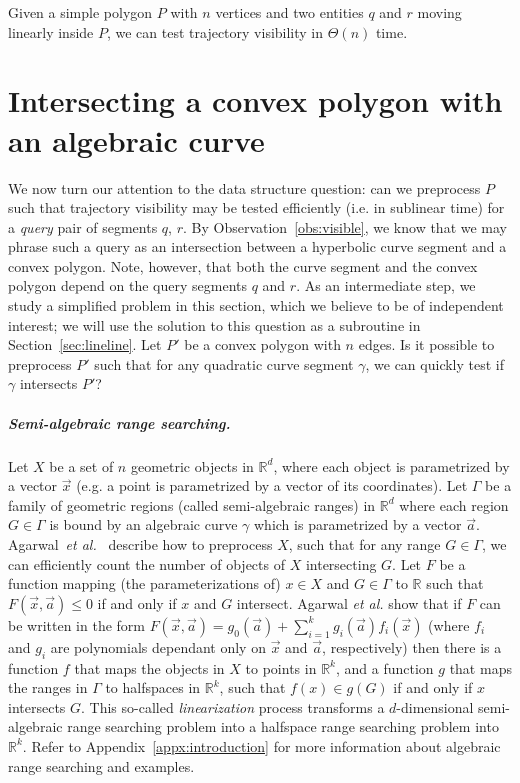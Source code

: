 \documentclass[UKenglish]{lipics-v2019}
\newcommand{\etal}{\textit{et al.}\xspace}
\newcommand{\mkmbb}[1]{\ensuremath{\mathbb{#1}}\xspace}
\newcommand{\R}{\mkmbb{R}}
\begin{document}
\begin{theorem}
  \label{thm:algorithm_simple_polygon}
  Given a simple polygon $P$ with $n$ vertices and two entities $q$ and $r$
  moving linearly inside $P$, we can test trajectory visibility in $\Theta(n)$ time.
\end{theorem}





  
\section{Intersecting a convex polygon with an algebraic curve}
\label{sec:prelims}
We now turn our attention to the data structure question: can we preprocess $P$ such that trajectory visibility may be tested efficiently (i.e. in sublinear time) for a {\em query} pair of segments $q$, $r$.
By Observation~\ref {obs:visible}, we know that we may phrase such a query as an intersection between a hyperbolic curve segment and a convex polygon.
Note, however, that both the curve segment and the convex polygon depend on the query segments $q$ and $r$.
As an intermediate step, we study a simplified problem in this section, which we believe to be of independent interest;
we will use the solution to this question as a subroutine in Section~\ref {sec:lineline}.
Let $P'$ be a convex polygon with $n$ edges. Is it possible to preprocess $P'$ such that for any quadratic curve segment $\gamma$, we can quickly test if $\gamma$ intersects $P'$? 


\subparagraph{Semi-algebraic range searching.}  Let $X$
be a set of $n$ geometric objects in $\mathbb{R}^d$, where each object
is parametrized by a vector $\vec{x}$ (e.g. a point is parametrized by
a vector of its coordinates). Let $\Gamma$ be a family of geometric
regions (called semi-algebraic ranges) in $\mathbb{R}^d$ where each
region $G \in \Gamma$ is bound by an algebraic curve $\gamma$ which is
parametrized by a vector
$\vec{a}$. Agarwal~\etal~\cite{agarwal2013range} describe how to 
preprocess $X$, such that for any range $G \in \Gamma$, we can
efficiently count the number of objects of $X$ intersecting $G$. Let
$F$ be a function mapping (the parameterizations of) $x \in X$ and $G \in \Gamma$ to
$\R$ such that $F(\vec{x},\vec{a}) \leq 0$ if and only if $x$ and $G$
intersect.
Agarwal \etal show that if $F$ can be written in the form $F(\vec{x}, \vec{a}) = g_0(\vec{a}) + \sum_{i=1}^k g_i(\vec{a})f_i(\vec{x})$ (where $f_i$ and $g_i$ are polynomials dependant only on $\vec{x}$ and $\vec{a}$, respectively) then there is a function $f$ that maps the objects in $X$ to points in $\R^k$, and a function $g$ that maps the ranges in $\Gamma$ to halfspaces in $\R^k$, such that $f(x) \in g(G)$ if and only if $x$ intersects $G$. 
This so-called \emph{linearization} process transforms a $d$-dimensional semi-algebraic range searching problem into a halfspace range searching problem into $\mathbb{R}^k$.
Refer to Appendix~\ref{appx:introduction} for more information about algebraic range searching and examples.
\end{document}

